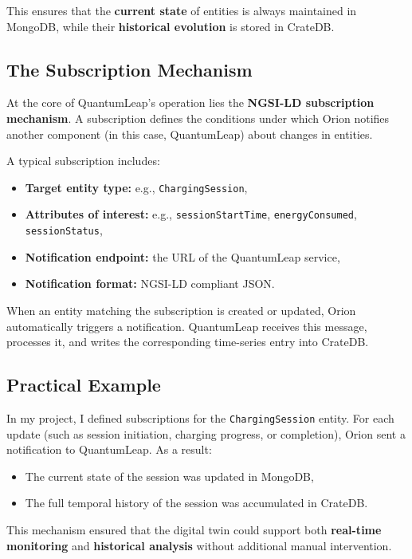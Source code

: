 This ensures that the \textbf{current state} of entities is always maintained in MongoDB, while their \textbf{historical evolution} is stored in CrateDB.

\subsection*{The Subscription Mechanism}
At the core of QuantumLeap’s operation lies the \textbf{NGSI-LD subscription mechanism}.  
A subscription defines the conditions under which Orion notifies another component (in this case, QuantumLeap) about changes in entities.

A typical subscription includes:
\begin{itemize}
    \item \textbf{Target entity type:} e.g., \texttt{ChargingSession},
    \item \textbf{Attributes of interest:} e.g., \texttt{sessionStartTime}, \texttt{energyConsumed}, \texttt{sessionStatus},
    \item \textbf{Notification endpoint:} the URL of the QuantumLeap service,
    \item \textbf{Notification format:} NGSI-LD compliant JSON.
\end{itemize}

When an entity matching the subscription is created or updated, Orion automatically triggers a notification. QuantumLeap receives this message, processes it, and writes the corresponding time-series entry into CrateDB.

\subsection*{Practical Example}
In my project, I defined subscriptions for the \texttt{ChargingSession} entity. For each update (such as session initiation, charging progress, or completion), Orion sent a notification to QuantumLeap.  
As a result:
\begin{itemize}
    \item The current state of the session was updated in MongoDB,
    \item The full temporal history of the session was accumulated in CrateDB.
\end{itemize}

This mechanism ensured that the digital twin could support both \textbf{real-time monitoring} and \textbf{historical analysis} without additional manual intervention.

